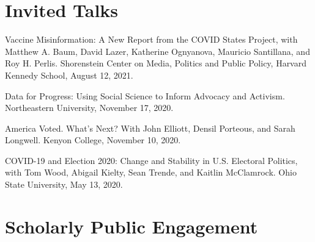 \documentclass[letterpaper]{article}
\renewenvironment{itemize}{
  \begin{list}{}{
    \setlength{\leftmargin}{1.5em}
  }
}{
  \end{list}
}
\begin{document}
\section*{Invited Talks}
\begin{itemize}

\item Vaccine Misinformation: A New Report from the COVID States Project, with Matthew A. Baum, David Lazer, Katherine Ognyanova, Mauricio Santillana, and Roy H. Perlis. Shorenstein Center on Media, Politics and Public Policy, Harvard Kennedy School, August 12, 2021.

\item Data for Progress: Using Social Science to Inform Advocacy and Activism. Northeastern University, November 17, 2020. 

\item America Voted. What's Next? With John Elliott, Densil Porteous, and Sarah Longwell. Kenyon College, November 10, 2020. 

\item COVID-19 and Election 2020: Change and Stability in U.S. Electoral Politics, with Tom Wood, Abigail Kielty, Sean Trende, and Kaitlin McClamrock. Ohio State University, May 13, 2020. 
\end{itemize}

\section*{Scholarly Public Engagement}
\end{document}
